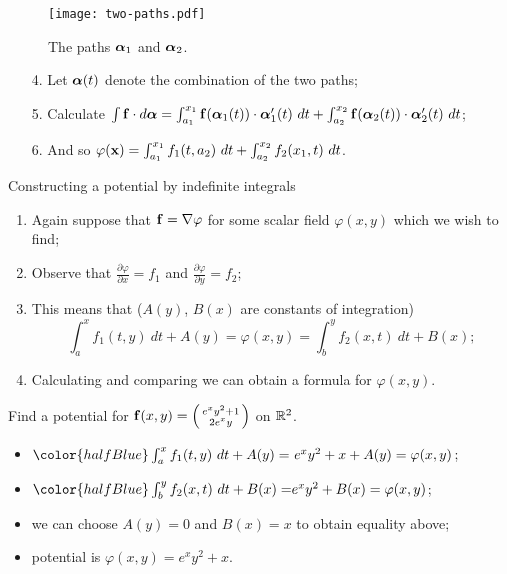 \begin{figure}[htbp]
    \centering
    \texttt{[image: two-paths.pdf]}
    \caption{The paths \(\boldsymbol{\alpha}_1\) and \(\boldsymbol{\alpha}_2\).}
\end{figure}

\begin{enumerate}
    \item[4.] Let \(\boldsymbol{\alpha}(t)\) denote the combination of the two paths;
    \item[5.] Calculate \(\int \mathbf{f} \cdot d\boldsymbol{\alpha} = \int_{a_1}^{x_1} \mathbf{f}(\boldsymbol{\alpha}_1(t))\cdot \boldsymbol{\alpha}_1'(t) \ dt +  \int_{a_2}^{x_2} \mathbf{f}(\boldsymbol{\alpha}_2(t))\cdot \boldsymbol{\alpha}_2'(t) \ dt \);
    \item[6.] And so \(\varphi(\mathbf{x})  = \int_{a_1}^{x_1} f_1(t,a_2)\ dt + \int_{a_2}^{x_2} f_2(x_1,t)\ dt \).
\end{enumerate}




{Constructing a potential by indefinite integrals}

\begin{enumerate}
    \item Again suppose that \(\mathbf{f} = \nabla \varphi\) for some scalar field \(\varphi(x,y)\) which we wish to find;
    \item Observe that \(\frac{\partial \varphi}{\partial x} = f_1\) and  \(\frac{\partial \varphi}{\partial y} = f_2\);
    \item  This means that (\(A(y)\), \(B(x)\) are constants of integration)
          \[
              \int_{a}^{x} f_1(t,y) \ dt + A(y) = \varphi(x,y) =  \int_{b}^{y} f_2(x,t) \ dt + B(x);
          \]
    \item Calculating and comparing we can obtain a formula for \(\varphi(x,y)\).
\end{enumerate}


\begin{example}
    Find a potential for \(\mathbf{f}(x,y) = \left(\begin{smallmatrix}
        e^x y^2 + 1\\ 2e^x y
    \end{smallmatrix}\right)\) on \(\mathbb{R}^2\).
    \begin{itemize}
        \item \({\color{halfBlue} \int_{a}^{x} f_1(t,y) \ dt + A(y) = } \ e^x y^2 + x + A(y) = \varphi(x,y)\);
        \item \( {\color{halfBlue} \int_{b}^{y} f_2(x,t) \ dt + B(x) = }  e^x y^2 + B(x) = \varphi(x,y) \);
        \item we can choose \(A(y) = 0\) and \(B(x)=x\) to obtain equality above;
        \item potential is \(\varphi(x,y) = e^x y^2 + x\).
    \end{itemize}
\end{example}




